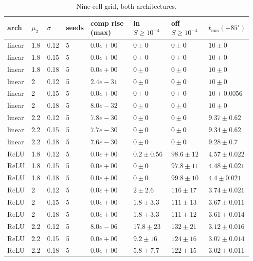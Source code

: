 \begin{table}[t]
\centering
\small
\caption{Nine-cell grid, both architectures.}
\label{tab:E2_cells}
\begin{tabular}{llllllll}
\toprule
arch & $\mu_2$ & $\sigma$ & seeds & comp rise (max) & in $S{\ge}10^{-4}$ & off $S{\ge}10^{-4}$ & $t_{\min}(-85^\circ)$ \\
\midrule
linear & 1.8 & 0.12 & 5 & $0.0e+00$ & $0\pm0$ & $0\pm0$ & $10\pm0$ \\
linear & 1.8 & 0.15 & 5 & $0.0e+00$ & $0\pm0$ & $0\pm0$ & $10\pm0$ \\
linear & 1.8 & 0.18 & 5 & $0.0e+00$ & $0\pm0$ & $0\pm0$ & $10\pm0$ \\
linear & 2 & 0.12 & 5 & $2.4e-31$ & $0\pm0$ & $0\pm0$ & $10\pm0$ \\
linear & 2 & 0.15 & 5 & $0.0e+00$ & $0\pm0$ & $0\pm0$ & $10\pm0.0056$ \\
linear & 2 & 0.18 & 5 & $8.0e-32$ & $0\pm0$ & $0\pm0$ & $10\pm0$ \\
linear & 2.2 & 0.12 & 5 & $7.8e-30$ & $0\pm0$ & $0\pm0$ & $9.37\pm0.62$ \\
linear & 2.2 & 0.15 & 5 & $7.7e-30$ & $0\pm0$ & $0\pm0$ & $9.34\pm0.62$ \\
linear & 2.2 & 0.18 & 5 & $7.6e-30$ & $0\pm0$ & $0\pm0$ & $9.28\pm0.7$ \\
ReLU & 1.8 & 0.12 & 5 & $0.0e+00$ & $0.2\pm0.56$ & $98.6\pm12$ & $4.57\pm0.022$ \\
ReLU & 1.8 & 0.15 & 5 & $0.0e+00$ & $0\pm0$ & $97.8\pm11$ & $4.48\pm0.021$ \\
ReLU & 1.8 & 0.18 & 5 & $0.0e+00$ & $0\pm0$ & $99.8\pm10$ & $4.4\pm0.021$ \\
ReLU & 2 & 0.12 & 5 & $0.0e+00$ & $2\pm2.6$ & $116\pm17$ & $3.74\pm0.021$ \\
ReLU & 2 & 0.15 & 5 & $0.0e+00$ & $1.8\pm3.3$ & $111\pm13$ & $3.67\pm0.011$ \\
ReLU & 2 & 0.18 & 5 & $0.0e+00$ & $1.8\pm3.3$ & $111\pm12$ & $3.61\pm0.014$ \\
ReLU & 2.2 & 0.12 & 5 & $8.0e-06$ & $17.8\pm23$ & $132\pm21$ & $3.12\pm0.016$ \\
ReLU & 2.2 & 0.15 & 5 & $0.0e+00$ & $9.2\pm16$ & $124\pm16$ & $3.07\pm0.014$ \\
ReLU & 2.2 & 0.18 & 5 & $0.0e+00$ & $5.8\pm7.7$ & $122\pm15$ & $3.02\pm0.011$ \\
\bottomrule
\end{tabular}
\end{table}
